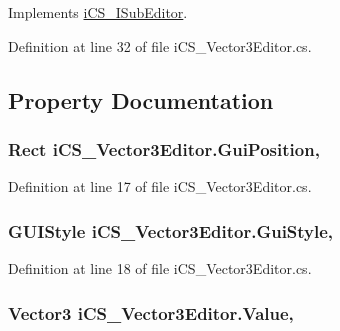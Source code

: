 Implements \hyperlink{interfacei_c_s___i_sub_editor_a724804497034baf9daa3df326d1b8a2f}{i\+C\+S\+\_\+\+I\+Sub\+Editor}.



Definition at line 32 of file i\+C\+S\+\_\+\+Vector3\+Editor.\+cs.



\subsection{Property Documentation}
\hypertarget{classi_c_s___vector3_editor_a3435eb3c93efdc71d3742dafa4d7f825}{
\subsubsection[{Gui\+Position}]{\setlength{\rightskip}{0pt plus 5cm}Rect i\+C\+S\+\_\+\+Vector3\+Editor.\+Gui\+Position\hspace{0.3cm}{\ttfamily [get]}, {\ttfamily [set]}}}\label{classi_c_s___vector3_editor_a3435eb3c93efdc71d3742dafa4d7f825}


Definition at line 17 of file i\+C\+S\+\_\+\+Vector3\+Editor.\+cs.

\hypertarget{classi_c_s___vector3_editor_a24112a1ea2e2ef287be2bb447a80512a}{
\subsubsection[{Gui\+Style}]{\setlength{\rightskip}{0pt plus 5cm}G\+U\+I\+Style i\+C\+S\+\_\+\+Vector3\+Editor.\+Gui\+Style\hspace{0.3cm}{\ttfamily [get]}, {\ttfamily [set]}}}\label{classi_c_s___vector3_editor_a24112a1ea2e2ef287be2bb447a80512a}


Definition at line 18 of file i\+C\+S\+\_\+\+Vector3\+Editor.\+cs.

\hypertarget{classi_c_s___vector3_editor_a259546dec6cf7de34fa55d31fb1cd755}{
\subsubsection[{Value}]{\setlength{\rightskip}{0pt plus 5cm}Vector3 i\+C\+S\+\_\+\+Vector3\+Editor.\+Value\hspace{0.3cm}{\ttfamily [get]}, {\ttfamily [set]}}}\label{classi_c_s___vector3_editor_a259546dec6cf7de34fa55d31fb1cd755}



